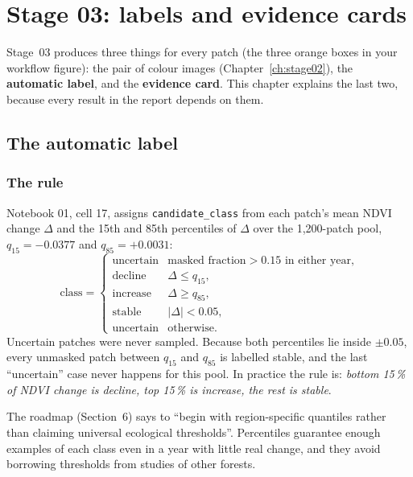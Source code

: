 \chapter{Stage 03: labels and evidence cards}
\label{ch:stage03}

Stage~03 produces three things for every patch (the three orange boxes in your workflow figure): the pair of colour images (Chapter~\ref{ch:stage02}), the \textbf{automatic label}, and the \textbf{evidence card}. This chapter explains the last two, because every result in the report depends on them.

\section{The automatic label}
\label{sec:labels}

\subsection{The rule}

Notebook 01, cell 17, assigns \texttt{candidate\_class} from each patch's mean NDVI change $\Delta$ and the 15th and 85th percentiles of $\Delta$ over the 1,200-patch pool, $q_{15} = -0.0377$ and $q_{85} = +0.0031$:
\begin{equation}
\text{class} =
\begin{cases}
\text{uncertain} & \text{masked fraction} > 0.15 \text{ in either year,}\\
\text{decline} & \Delta \le q_{15},\\
\text{increase} & \Delta \ge q_{85},\\
\text{stable} & |\Delta| < 0.05,\\
\text{uncertain} & \text{otherwise.}
\end{cases}
\label{eq:labelrule}
\end{equation}
Uncertain patches were never sampled. Because both percentiles lie inside $\pm0.05$, every unmasked patch between $q_{15}$ and $q_{85}$ is labelled stable, and the last ``uncertain'' case never happens for this pool. In practice the rule is: \emph{bottom 15\,\% of NDVI change is decline, top 15\,\% is increase, the rest is stable}.

\begin{whybox}
The roadmap (Section~6) says to ``begin with region-specific quantiles rather than claiming universal ecological thresholds''. Percentiles guarantee enough examples of each class even in a year with little real change, and they avoid borrowing thresholds from studies of other forests.
\end{whybox}

